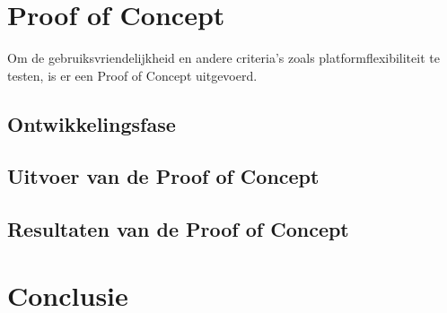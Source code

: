 \section*{Proof of Concept}
\label{sec:proof-of-concept}
Om de gebruiksvriendelijkheid en andere criteria's zoals platformflexibiliteit te testen, is er een Proof of Concept uitgevoerd.
\subsection*{Ontwikkelingsfase}
\subsection*{Uitvoer van de Proof of Concept}
\subsection*{Resultaten van de Proof of Concept}

\section*{Conclusie}

